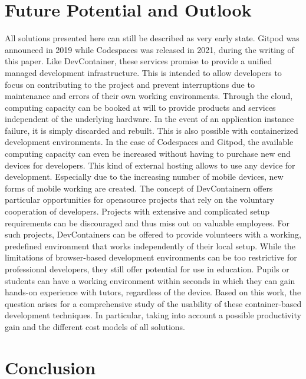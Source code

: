 \documentclass[12pt, a4paper]{article}
\begin{document}
\section{Future Potential and Outlook}\label{sec::outlook}
All solutions presented here can still be described as very early state. Gitpod was announced in 2019 while Codespaces was released in 2021, during the writing of this paper. Like DevContainer, these services promise to provide a unified managed development infrastructure. This is intended to allow developers to focus on contributing to the project and prevent interruptions due to maintenance and errors of their own working environments. Through the cloud, computing capacity can be booked at will to provide products and services independent of the underlying hardware. In the event of an application instance failure, it is simply discarded and rebuilt. This is also possible with containerized development environments. In the case of Codespaces and Gitpod, the available computing capacity can even be increased without having to purchase new end devices for developers. This kind of external hosting allows to use any device for development. Especially due to the increasing number of mobile devices, new forms of mobile working are created. \newline
The concept of DevContainern offers particular opportunities for opensource projects that rely on the voluntary cooperation of developers. Projects with extensive and complicated setup requirements can be discouraged and thus miss out on valuable employees. For such projects, DevContainers can be offered to provide volunteers with a working, predefined environment that works independently of their local setup. While the limitations of browser-based development environments can be too restrictive for professional developers, they still offer potential for use in education. Pupils or students can have a working environment within seconds in which they can gain hands-on experience with tutors, regardless of the device. \newline
Based on this work, the question arises for a comprehensive study of the usability of these container-based development techniques. In particular, taking into account a possible productivity gain and the different cost models of all solutions.

\section{Conclusion}\label{sec::conclusion}
\end{document}

